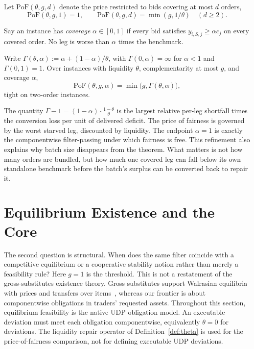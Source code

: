 \documentclass{llncs}
\newcommand{\PoF}{\mathrm{PoF}}
\begin{document}
\begin{proposition}\label{prop:dirrel}
Let $\PoF(\theta,g,d)$ denote the price restricted to bids covering at most
$d$ orders,
\[
  \PoF(\theta,g,1)=1,\qquad
  \PoF(\theta,g,d)=\min(g,1/\theta)\quad(d\ge2).
\]
\end{proposition}

Say an instance has \emph{coverage} $\alpha\in[0,1]$ if every bid
satisfies $y_{i,S,j}\ge\alpha c_j$ on every covered order. No leg is
worse than $\alpha$ times the benchmark.

\begin{theorem}\label{thm:coverage}
Write
$\Gamma(\theta,\alpha):=\alpha+(1-\alpha)/\theta$, with
$\Gamma(0,\alpha)=\infty$ for $\alpha<1$ and $\Gamma(0,1)=1$. Over
instances with liquidity $\theta$, complementarity at most $g$, and
coverage $\alpha$,
\[
\PoF(\theta,g,\alpha)=\min\!\big(g,\Gamma(\theta,\alpha)\big),
\]
tight on two-order instances.
\end{theorem}

The quantity $\Gamma-1=(1-\alpha)\cdot\frac{1-\theta}{\theta}$ is the
largest relative per-leg shortfall times the conversion loss per unit of
delivered deficit. The price of fairness is governed by the worst starved leg,
discounted by liquidity. The endpoint $\alpha=1$ is exactly the
componentwise filter-passing under which fairness is free. This
refinement also explains why batch size disappears from the theorem. What
matters is not how many orders are bundled, but how much one covered leg
can fall below its own standalone benchmark before the batch's surplus
can be converted back to repair it.

\section{Equilibrium Existence and the Core}\label{sec:walras}

The second question is structural. When does the same filter coincide
with a competitive equilibrium or a cooperative stability notion rather
than merely a feasibility rule? Here $g=1$ is the threshold.
This is not a restatement of the gross-substitutes existence theory.
Gross substitutes support Walrasian equilibria with prices and transfers
over items~\cite{gul1999,kelso1982}, whereas our frontier is about
componentwise obligations in traders' requested assets.
Throughout this section, equilibrium feasibility is the native UDP
obligation model. An executable deviation must meet each obligation
componentwise, equivalently $\theta=0$ for deviations. The liquidity repair
operator of Definition~\ref{def:theta} is used for the price-of-fairness
comparison, not for defining executable UDP deviations.
\end{document}
